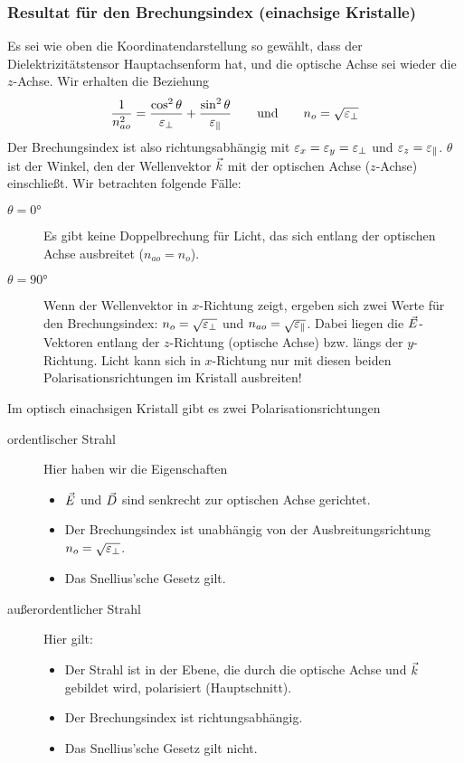 \subsubsection[Resultat für den Brechungsindex]%
{Resultat für den Brechungsindex (einachsige Kristalle)}
Es sei wie oben die Koordinatendarstellung so gewählt, dass der
Dielektrizitätstensor Hauptachsenform hat, und die optische Achse sei
wieder die $z$-Achse. Wir erhalten die Beziehung
\begin{gather*}
  \frac{1}{n_{ao}^2} 
  = \frac{\cos^2\theta}{\varepsilon_\bot} + \frac{\sin^2\theta}{\varepsilon_\parallel}
  \qquad\text{und} \qquad
  n_o = \sqrt{\varepsilon_\bot}
\end{gather*}
Der Brechungsindex ist also richtungsabhängig mit
$\varepsilon_x=\varepsilon_y=\varepsilon_\bot$ und $\varepsilon_z=\varepsilon_\parallel$.
$\theta$ ist der Winkel, den der Wellenvektor $\vec{k}$ mit der optischen
Achse ($z$-Achse) einschließt.
Wir betrachten folgende Fälle:
\begin{description}
\item[$\theta=\ang{0}$] Es gibt keine Doppelbrechung für Licht, das
  sich entlang der optischen Achse ausbreitet ($n_{ao} = n_o$).
\item[$\theta=\ang{90}$] Wenn der Wellenvektor in $x$-Richtung zeigt,
  ergeben sich zwei Werte für den Brechungsindex: 
  $n_o=\sqrt{\varepsilon_\bot}$ und $n_{ao}=\sqrt{\varepsilon_\parallel}$.
  Dabei liegen die $\vec{E}$-Vektoren entlang der $z$-Richtung (optische
  Achse) bzw. längs der $y$-Richtung. Licht kann sich in $x$-Richtung
  nur mit diesen beiden Polarisationsrichtungen im Kristall ausbreiten!
\end{description}
Im optisch einachsigen Kristall gibt es zwei Polarisationsrichtungen
\begin{description}
\item[ordentlischer Strahl] Hier haben wir die Eigenschaften
  \begin{itemize}
  \item $\vec{E}$ und $\vec{D}$ sind senkrecht zur optischen Achse
    gerichtet.
  \item Der Brechungsindex ist unabhängig von der Ausbreitungsrichtung
    $n_o=\sqrt{\varepsilon_\bot}$.
  \item Das Snellius'sche Gesetz gilt.
  \end{itemize}
\item[außerordentlicher Strahl] Hier gilt:
  \begin{itemize}
  \item Der Strahl ist in der Ebene, die durch die optische Achse und
    $\vec{k}$ gebildet wird, polarisiert
    (Hauptschnitt).
    \item Der Brechungsindex ist richtungsabhängig.
    \item Das Snellius'sche Gesetz gilt nicht.
  \end{itemize}
\end{description}

